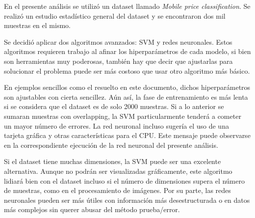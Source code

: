 \documentclass[12pt,a4paper,table]{article}
\begin{document}
En el presente análisis se utilizó un dataset llamado \emph{Mobile price
classification}. Se realizó un estudio estadístico general del dataset y
se encontraron dos mil muestras en el mismo.

Se decidió aplicar dos algoritmos avanzados: SVM y redes neuronales.
Estos algoritmos requieren trabajo al afinar los hiperparámetros de cada
modelo, si bien son herramientas muy poderosas, también hay que decir
que ajustarlas para solucionar el problema puede ser más costoso que
usar otro algoritmo más básico.

En ejemplos sencillos como el resuelto en este documento, dichos
hiperparámetros son ajustables con cierta sencillez. Aún así, la fase de
entrenamiento es más lenta si se considera que el dataset es de solo
2000 muestras. Si a lo anterior se sumaran muestras con overlapping, la
SVM particularmente tenderá a cometer un mayor número de errores. La red
neuronal incluso sugería el uso de una tarjeta gráfica y otras
características para el CPU. Este mensaje puede observarse en la
correspondiente ejecución de la red neuronal del presente análisis.

Si el dataset tiene muchas dimensiones, la SVM puede ser una excelente
alternativa. Aunque no podrán ser visualizadas gráficamente, este
algoritmo lidiará bien con el dataset incluso si el número de
dimensiones supera el número de muestras, como en el procesamiento de
imágenes. Por su parte, las redes neuronales pueden ser más útiles con
información más desestructurada o en datos más complejos sin querer
abusar del método prueba/error.


    
        
    
    
    
\end{document}

